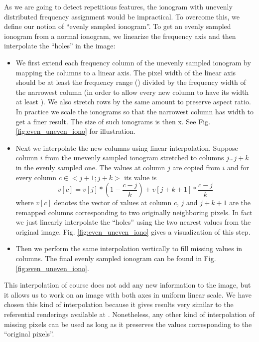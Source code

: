 As we are going to detect repetitious features, the ionogram with unevenly distributed frequency assignment would be impractical. To overcome this, we define our notion of ``evenly sampled ionogram''. To get an evenly sampled ionogram from a normal ionogram, we linearize the frequency axis and then interpolate the ``holes'' in the image:

\begin{itemize}
  \item We first extend each frequency column of the unevenly sampled ionogram by mapping the columns to a linear axis. The pixel width of the linear axis should be at least the frequency range () divided by the frequency width of the narrowest column (in order to allow every new column to have its width at least ). We also stretch rows by the same amount to preserve aspect ratio. In practice we scale the ionograms so that the narrowest column has width  to get a finer result. The size of such ionograms is then x. See Fig. \ref{fig:even_uneven_iono} for illustration.
  \item Next we interpolate the new columns using linear interpolation. Suppose column $i$ from the unevenly sampled ionogram stretched to columns $j$\ldots$j+k$ in the evenly sampled one. The values at column $j$ are copied from $i$ and for every column $c\in<j+1; j+k>$ its value is $$v[c] = v[j]*(1-\frac{c-j}{k}) + v[j+k+1]*\frac{c-j}{k}$$ where $v[c]$ denotes the vector of values at column $c$, $j$ and $j+k+1$ are the remapped columns corresponding to two originally neighboring pixels. In fact we just linearly interpolate the ``holes'' using the two nearest values from the original image. Fig. \ref{fig:even_uneven_iono} gives a visualization of this step. 
  \item Then we perform the same interpolation vertically to fill missing values in columns. The final evenly sampled ionogram can be found in Fig. \ref{fig:even_uneven_iono}.
\end{itemize}

This interpolation of course does not add any new information to the image, but it allows us to work on an image with both axes in uniform linear scale. We have chosen this kind of interpolation because it gives results very similar to the referential renderings available at \citep{FTP}. Nonetheless, any other kind of interpolation of missing pixels can be used as long as it preserves the values corresponding to the ``original pixels''.

